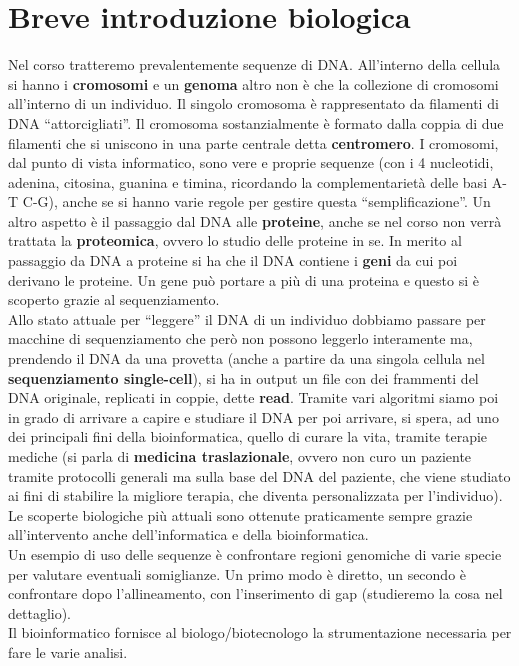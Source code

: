 \documentclass[a4paper,12pt, oneside]{book}
\begin{document}
\section{Breve introduzione biologica}
Nel corso tratteremo prevalentemente sequenze di DNA. All'interno della cellula
si hanno i \textbf{cromosomi} e un \textbf{genoma} altro non è che la collezione
di cromosomi all'interno di un individuo. Il singolo cromosoma è rappresentato
da filamenti di DNA ``attorcigliati''. Il cromosoma sostanzialmente è formato
dalla coppia di due filamenti che si uniscono in una parte centrale detta
\textbf{centromero}. I cromosomi, dal punto di vista informatico, sono vere e
proprie sequenze (con i 4 nucleotidi, adenina, citosina, guanina e timina,
ricordando la complementarietà delle basi A-T C-G),
anche se si hanno varie regole per gestire questa 
``semplificazione''. Un altro aspetto è il passaggio dal DNA alle
\textbf{proteine}, anche se nel corso non verrà trattata la \textbf{proteomica},
ovvero lo studio delle proteine in se. In merito al passaggio da DNA a proteine
si ha che il DNA contiene i \textbf{geni} da cui poi derivano le proteine. Un
gene può portare a più di una proteina e questo si è scoperto grazie al
sequenziamento. \\
Allo stato attuale per ``leggere'' il DNA di un individuo dobbiamo passare per
macchine di sequenziamento che però non possono leggerlo interamente ma,
prendendo il DNA da una provetta (anche a partire da una singola cellula nel
\textbf{sequenziamento single-cell}), si ha in output un file con dei frammenti
del DNA originale, replicati in coppie, dette \textbf{read}. Tramite vari
algoritmi siamo poi in grado di arrivare a capire e studiare il DNA per poi
arrivare, si spera, ad uno dei principali fini della bioinformatica, quello di
curare la vita, tramite terapie mediche (si parla di \textbf{medicina
  traslazionale}, ovvero non curo un paziente tramite protocolli generali ma
sulla base del DNA del paziente, che viene studiato ai fini di stabilire la
migliore terapia, che diventa personalizzata per l'individuo). Le scoperte
biologiche più attuali sono ottenute praticamente sempre grazie all'intervento
anche dell'informatica e della bioinformatica.\\
Un esempio di uso delle sequenze è confrontare regioni genomiche di varie specie
per valutare eventuali somiglianze. Un primo modo è diretto, un secondo è
confrontare dopo l'allineamento, con l'inserimento di gap (studieremo la cosa
nel dettaglio).\\
Il bioinformatico fornisce al biologo/biotecnologo la strumentazione necessaria
per fare le varie analisi.
\end{document}
